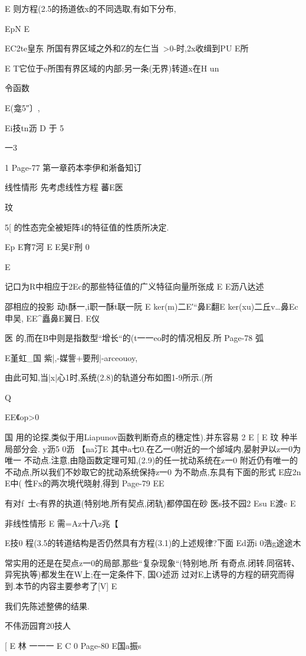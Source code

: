 {{E
则方程(2.5的扬道依x的不同选取,有如下分布,

EpN
E

EC2te皇东
所国有界区域之外和Z的左仁当~>0-时,2x收缉到PU
E所

E
T它位于e所围有界区域的内部;另一条(无界)转道x在H
un

令函数

E(龛5″〕,

Ei技tn沥
D
于
5

一3

1
Page-77
第一章药本李伊和淅备知订

线性情形
先考虑线性方程
蕃E医

玟

5[
的性态完全被矩阵4的特征值的性质所决定.

Ep
E育7河
E
E吴F刑
0

E

记口为R中相应于2Ec的那些特征值的广义特征向量所张成
E
E沥八达述

邵相应的投影
动t酥一,i职一酥t联一阮
E
ker(m)二E′“鼻E翻E
ker(xu)二丘v…鼻Ec申吴,
EE^矗鼻E翼日.
E仪

医
的,而在B中则是指数型“增长“的(t一一eo时的情况相反.所
Page-78
弧

E堇虹_国
紫|,-媒訾+要刑|-arceouoy,

由此可知,当|x|心1时,系统(2.8)的轨道分布如图1-9所示.(所

Q

EE《op>0

国
用的论探,类似于用Liapunov函数判断奇点的穗定性).并东容易
2
E
[
E
玟
种半局部分会.
y沥5
0沥
【na汀E
其中a七0.在乙一0附近的一个邰域内,晏射尹以z一0为唯一
不动点.注意,由隐函数定理可知,(2.9)的任一扰动系统在z一0
附近仍有唯一的不动点,所以我们不妙取它的扰动系统保持z一0
为不助点,东具有下面的形式
E应2n
E中(
性Fx的两次境代晓射,得到
Page-79
EE

有对f~士c有界的执道(特别地,所有契点,闭轨)都停国在砂
医s技不园2
Esu
E渡c
E

非线性情形
E
需=Az十八z兆【

E技0
程(3.5的转道结构是否仍然具有方程(3.1)的上述规律?下面
Ed沥i
0浩g途途木

常实用的还是在契点z一0的局部,那些“复杂现象“(特别地,所
有奇点.闭转.同宿转、异宪执等)都发生在W上;在一定条件下,
国O述沥
过对E上诱导的方程的研究而得到.本节的内容主要参考了[V]
E

我们先陈述整佛的结果.

不伟沥园育20技人

[
E
林
一一一
E
C
0
Page-80
E国a振s

}}
